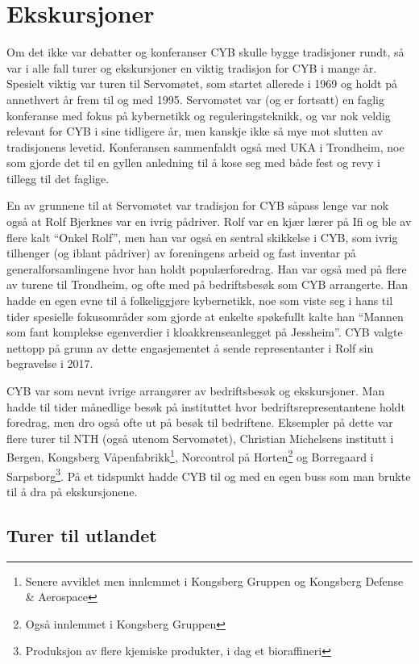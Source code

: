 \section{Ekskursjoner}

Om det ikke var debatter og konferanser CYB skulle bygge tradisjoner rundt, så var i alle fall turer og ekskursjoner en viktig tradisjon for CYB i mange år. Spesielt viktig var turen til Servomøtet, som startet allerede i 1969 og holdt på annethvert år frem til og med 1995. Servomøtet var (og er fortsatt) en faglig konferanse med fokus på kybernetikk og reguleringsteknikk, og var nok veldig relevant for CYB i sine tidligere år, men kanskje ikke så mye mot slutten av tradisjonens levetid. Konferansen sammenfaldt også med UKA i Trondheim, noe som gjorde det til en gyllen anledning til å kose seg med både fest og revy i tillegg til det faglige.

En av grunnene til at Servomøtet var tradisjon for CYB såpass lenge var nok også at Rolf Bjerknes var en ivrig pådriver. Rolf var en kjær lærer på Ifi og ble av flere kalt ``Onkel Rolf'', men han var også en sentral skikkelse i CYB, som ivrig tilhenger (og iblant pådriver) av foreningens arbeid og fast inventar på generalforsamlingene hvor han holdt populærforedrag. Han var også med på flere av turene til Trondheim, og ofte med på bedriftsbesøk som CYB arrangerte. Han hadde en egen evne til å folkeliggjøre kybernetikk, noe som viste seg i hans til tider spesielle fokusområder som gjorde at enkelte spøkefullt kalte han ``Mannen som fant komplekse egenverdier i kloakkrenseanlegget på Jessheim''. CYB valgte nettopp på grunn av dette engasjementet å sende representanter i Rolf sin begravelse i 2017.

CYB var som nevnt ivrige arrangører av bedriftsbesøk og ekskursjoner. Man hadde til tider månedlige besøk på instituttet hvor bedriftsrepresentantene holdt foredrag, men dro også ofte ut på besøk til bedriftene. Eksempler på dette var flere turer til NTH (også utenom Servomøtet), Christian Michelsens institutt i Bergen, Kongsberg Våpenfabrikk\footnote{Senere avviklet men innlemmet i Kongsberg Gruppen og Kongsberg Defense \& Aerospace}, Norcontrol på Horten\footnote{Også innlemmet i Kongsberg Gruppen} og Borregaard i Sarpsborg\footnote{Produksjon av flere kjemiske produkter, i dag et bioraffineri}. På et tidspunkt hadde CYB til og med en egen buss som man brukte til å dra på ekskursjonene.

\subsection{Turer til utlandet}

